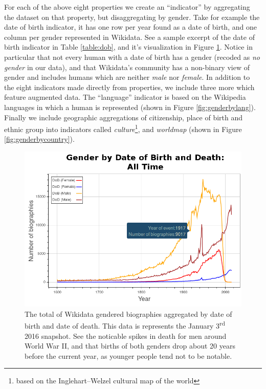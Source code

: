 \documentclass{sig-alternate-05-2015}
\begin{document}
For each of the above eight properties we create an ``indicator'' by aggregating the dataset on that property, but disaggregating by gender. Take for example the date of birth indicator, it has one row per year found as a date of birth, and one column per gender represented in Wikidata. See a sample excerpt of the date of birth indicator in Table \ref{table:dob}, and it's visualization in Figure \ref{fig:genderbydob}. Notice in particular that not every human with a date of birth has a gender (recoded as \textit{no gender} in our data), and that Wikidata's community has a non-binary view of gender and includes humans which are neither \textit{male} nor \textit{female}. In addition to the eight indicators made directly from properties, we include three more which feature augmented data. The ``language'' indicator is based on the Wikipedia languages in which a human is represented (shown in Figure \ref{fig:genderbylang}). Finally we include geographic aggregations of citizenship, place of birth and ethnic group into indicators called \textit{culture}\footnote{based on the Inglehart–Welzel cultural map of the world}, and \textit{worldmap} (shown in Figure \ref{fig:genderbycountry}).


\begin{figure}
\includegraphics[width=\columnwidth]{figures/genderbydob.png} 
\caption{The total of Wikidata gendered biographies aggregated by date of birth and date of death. This data is represents the January 3\textsuperscript{rd} 2016 snapshot. See the noticable spikes in death for men around World War II, and that births of both genders drop about 20 years before the current year, as younger people tend not to be notable.}
\label{fig:genderbydob}
\end{figure}
\end{document}
